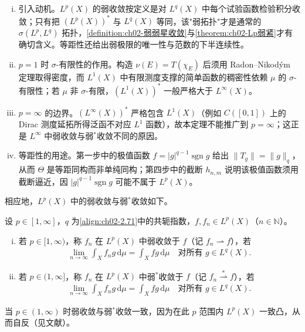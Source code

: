 \documentclass[../../main.tex]{subfiles}%
\begin{document}
\begin{remark}\label{remark:ch02-Lp对偶}
\begin{enumerate}[(i)]
\item 引入动机。$L^p(X)$ 的弱收敛按定义是对 $L^q(X)$ 中每个试验函数检验积分收敛；只有把 $(L^p(X))^*$ 与 $L^q(X)$ 等同，该"弱拓扑"才是通常的 $\sigma(L^p,L^q)$ 拓扑，\cref{definition:ch02-弱弱星收敛}与\cref{theorem:ch02-Lp弱紧}才有确切含义。等距性还给出弱极限的唯一性与范数的下半连续性。
\item $p=1$ 时 $\sigma$-有限性的作用。构造 $\nu(E)=T(\chi_E)$ 后须用 Radon--Nikodým 定理取得密度，而 $L^1(X)$ 中有限测度支撑的简单函数的稠密性依赖 $\mu$ 的 $\sigma$-有限性；若 $\mu$ 非 $\sigma$-有限，$(L^1(X))^*$ 一般严格大于 $L^\infty(X)$。
\item $p=\infty$ 的边界。$(L^\infty(X))^*$ 严格包含 $L^1(X)$（例如 $C([0,1])$ 上的 Dirac 测度延拓所得泛函不对应 $L^1$ 函数），故本定理不能推广到 $p=\infty$；这正是 $L^\infty$ 中弱收敛与弱$^*$收敛不同的原因。
\item 等距性的用途。第一步中的极值函数 $f=|g|^{q-1}\operatorname{sgn}g$ 给出 $\|T_g\|=\|g\|_q$，从而 $\Theta$ 是等距同构而非单纯同构；第四步中的截断 $h_{n,m}$ 说明该极值函数须用截断逼近，因 $|g|^{q-1}\operatorname{sgn}g$ 可能不属于 $L^p(X)$。
\end{enumerate}
\end{remark}

相应地，$L^p(X)$ 中的弱收敛与弱$^*$收敛如下。

\begin{definition}\label{definition:ch02-弱弱星收敛}
设 $p\in[1,\infty]$，$q$ 为\eqref{align:ch02-2.71}中的共轭指数，$f,f_n\in L^p(X)$（$n\in\mathbb N$）。
\begin{enumerate}[(i)]
\item 若 $p\in[1,\infty)$，称 $f_n$ 在 $L^p(X)$ 中弱收敛于 $f$（记 $f_n\rightharpoonup f$），若
\begin{align*}
\lim_{n\to\infty}\int_X f_ng\,\mathrm{d}\mu=\int_X fg\,\mathrm{d}\mu\quad\text{对所有 }g\in L^q(X).
\end{align*}
\item 若 $p\in(1,\infty]$，称 $f_n$ 在 $L^p(X)$ 中弱$^*$收敛于 $f$（记 $f_n\stackrel{*}{\rightharpoonup}f$），若
\begin{align*}
\lim_{n\to\infty}\int_X f_ng\,\mathrm{d}\mu=\int_X fg\,\mathrm{d}\mu\quad\text{对所有 }g\in L^q(X).
\end{align*}
\end{enumerate}
\end{definition}
当 $p\in(1,\infty)$ 时弱收敛与弱$^*$收敛一致，因为在此 $p$ 范围内 $L^p(X)$ 一致凸，从而自反（见文献\cite{ref25,ref58}）。
\end{document}
